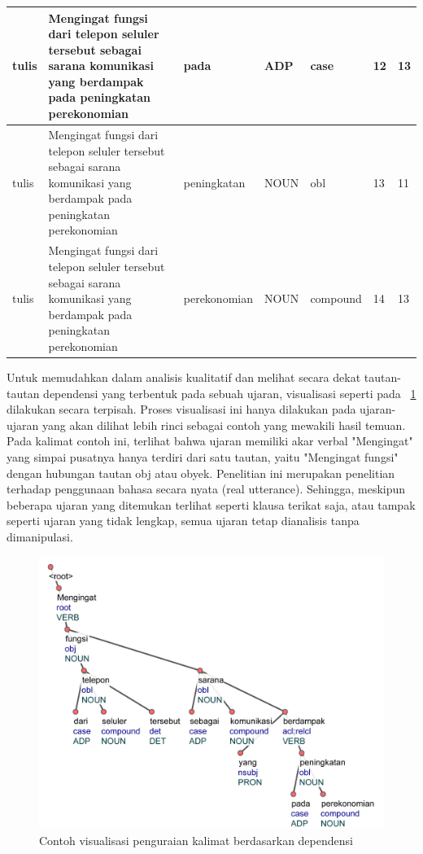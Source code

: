 \begin{center}
\begin{table}
\begin{tiny}
\begin{tabulary}{1\textwidth}{| L | L | L | L | L | L | L |}
tulis & Mengingat fungsi dari telepon seluler tersebut sebagai sarana komunikasi yang berdampak pada peningkatan perekonomian & pada & ADP & case & 12 & 13 \\ \hline
tulis & Mengingat fungsi dari telepon seluler tersebut sebagai sarana komunikasi yang berdampak pada peningkatan perekonomian & peningkatan & NOUN & obl & 13 & 11 \\ \hline
tulis & Mengingat fungsi dari telepon seluler tersebut sebagai sarana komunikasi yang berdampak pada peningkatan perekonomian & perekonomian & NOUN & compound & 14 & 13 \\ 
\hline
  \end{tabulary}  
\end{tiny}
\end{table}
\end{center}

Untuk memudahkan dalam analisis kualitatif dan melihat secara dekat tautan-tautan dependensi yang terbentuk pada sebuah ujaran, visualisasi seperti pada \pic~\ref{fig:visualisasi_penguraian} dilakukan secara terpisah. Proses visualisasi ini hanya dilakukan pada ujaran-ujaran yang akan dilihat lebih rinci sebagai contoh yang mewakili hasil temuan. Pada kalimat contoh ini, terlihat bahwa ujaran memiliki akar verbal "Mengingat" yang simpai pusatnya hanya terdiri dari satu tautan, yaitu "Mengingat fungsi" dengan hubungan tautan obj atau obyek. Penelitian ini merupakan penelitian terhadap penggunaan bahasa secara nyata (real utterance). Sehingga,  meskipun beberapa ujaran yang ditemukan terlihat seperti klausa terikat saja, atau tampak seperti ujaran yang tidak lengkap, semua ujaran tetap dianalisis tanpa dimanipulasi.

\begin{figure}
	\centering \includegraphics[width=0.8
	\textwidth] {pics/visualisasi_penguraian.jpg} 
	\caption{Contoh visualisasi penguraian kalimat berdasarkan dependensi} 
\label{fig:visualisasi_penguraian} \end{figure}

